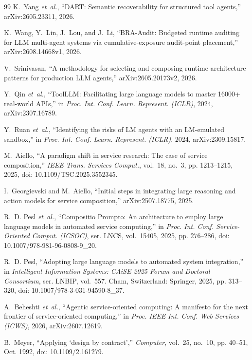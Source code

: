 \documentclass[10pt,journal,compsoc]{IEEEtran}
\begin{document}
\begin{thebibliography}{99}
K.~Yang \emph{et~al.}, ``DART: Semantic recoverability for structured tool agents,'' arXiv:2605.23311, 2026.

K.~Wang, Y.~Lin, J.~Lou, and J.~Li, ``BRA-Audit: Budgeted runtime auditing for LLM multi-agent systems via cumulative-exposure audit-point placement,'' arXiv:2608.14668v1, 2026.

V.~Srinivasan, ``A methodology for selecting and composing runtime architecture patterns for production LLM agents,'' arXiv:2605.20173v2, 2026.

Y.~Qin \emph{et~al.}, ``ToolLLM: Facilitating large language models to master 16000+ real-world APIs,'' in \emph{Proc. Int. Conf. Learn. Represent. (ICLR)}, 2024, arXiv:2307.16789.

Y.~Ruan \emph{et~al.}, ``Identifying the risks of LM agents with an LM-emulated sandbox,'' in \emph{Proc. Int. Conf. Learn. Represent. (ICLR)}, 2024, arXiv:2309.15817.

M.~Aiello, ``A paradigm shift in service research: The case of service composition,'' \emph{IEEE Trans. Services Comput.}, vol.~18, no.~3, pp. 1213--1215, 2025, doi: 10.1109/TSC.2025.3552345.

I.~Georgievski and M.~Aiello, ``Initial steps in integrating large reasoning and action models for service composition,'' arXiv:2507.18775, 2025.

R.~D. Pesl \emph{et~al.}, ``Compositio Prompto: An architecture to employ large language models in automated service computing,'' in \emph{Proc. Int. Conf. Service-Oriented Comput. (ICSOC)}, ser. LNCS, vol.~15405, 2025, pp. 276--286, doi: 10.1007/978-981-96-0808-9\_20.

R.~D. Pesl, ``Adopting large language models to automated system integration,'' in \emph{Intelligent Information Systems: CAiSE 2025 Forum and Doctoral Consortium}, ser. LNBIP, vol.~557. Cham, Switzerland: Springer, 2025, pp. 313--320, doi: 10.1007/978-3-031-94590-8\_37.

A.~Beheshti \emph{et~al.}, ``Agentic service-oriented computing: A manifesto for the next frontier of service-oriented computing,'' in \emph{Proc. IEEE Int. Conf. Web Services (ICWS)}, 2026, arXiv:2607.12619.

B.~Meyer, ``Applying `design by contract','' \emph{Computer}, vol.~25, no.~10, pp. 40--51, Oct. 1992, doi: 10.1109/2.161279.


\end{thebibliography}
\end{document}

